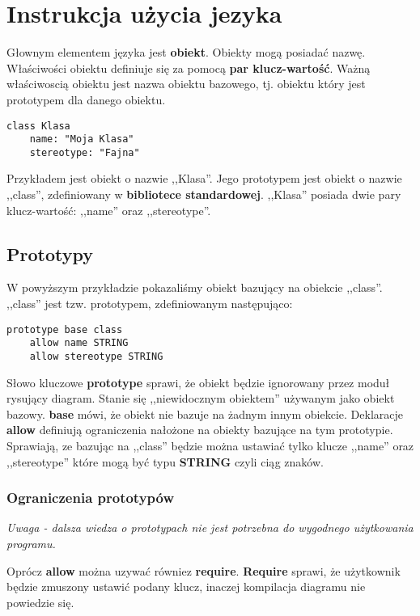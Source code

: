 \section{Instrukcja użycia jezyka}

Głownym elementem języka jest \textbf{obiekt}. Obiekty mogą posiadać nazwę. Właściwości obiektu definiuje się za pomocą \textbf{par klucz-wartość}. Ważną właściwoscią obiektu jest nazwa obiektu bazowego, tj. obiektu który jest prototypem dla danego obiektu.

\begin{lstlisting}
class Klasa
	name: "Moja Klasa"
	stereotype: "Fajna"
\end{lstlisting}

Przykładem jest obiekt o nazwie ,,Klasa''. Jego prototypem jest obiekt o nazwie ,,class'', zdefiniowany w \textbf{bibliotece standardowej}. ,,Klasa'' posiada dwie pary klucz-wartość: ,,name'' oraz ,,stereotype''.

\subsection{Prototypy}

W powyższym przykładzie pokazaliśmy obiekt bazujący na obiekcie ,,class''. ,,class'' jest tzw. prototypem, zdefiniowanym następująco:

\begin{lstlisting}
prototype base class
    allow name STRING
    allow stereotype STRING
\end{lstlisting}

Słowo kluczowe \textbf{prototype} sprawi, że obiekt będzie ignorowany przez moduł rysujący diagram. Stanie się ,,niewidocznym obiektem'' używanym jako obiekt bazowy. \textbf{base} mówi, że obiekt nie bazuje na żadnym innym obiekcie. Deklaracje \textbf{allow} definiują ograniczenia nałożone na obiekty bazujące na tym prototypie. Sprawiają, ze bazując na ,,class'' będzie można ustawiać tylko klucze ,,name'' oraz ,,stereotype'' które mogą być typu \textbf{STRING} czyli ciąg znaków.

\subsubsection{Ograniczenia prototypów}

\emph{Uwaga - dalsza wiedza o prototypach nie jest potrzebna do wygodnego użytkowania programu.}

Oprócz \textbf{allow} można uzywać równiez \textbf{require}. \textbf{Require} sprawi, że użytkownik będzie zmuszony ustawić podany klucz, inaczej kompilacja diagramu nie powiedzie się.

